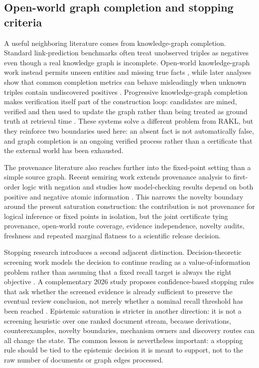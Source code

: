 \subsection{Open-world graph completion and stopping criteria}

A useful neighboring literature comes from knowledge-graph completion. Standard link-prediction benchmarks often treat unobserved triples as negatives even though a real knowledge graph is incomplete. Open-world knowledge-graph work instead permits unseen entities and missing true facts \cite{shi2017}, while later analyses show that common completion metrics can behave misleadingly when unknown triples contain undiscovered positives \cite{yang2022}. Progressive knowledge-graph completion makes verification itself part of the construction loop: candidates are mined, verified and then used to update the graph rather than being treated as ground truth at retrieval time \cite{li2024kg}. These systems solve a different problem from RAKL, but they reinforce two boundaries used here: an absent fact is not automatically false, and graph completion is an ongoing verified process rather than a certificate that the external world has been exhausted.

The provenance literature also reaches further into the fixed-point setting than a simple source graph. Recent semiring work extends provenance analysis to first-order logic with negation and studies how model-checking results depend on both positive and negative atomic information \cite{gradel2024}. This narrows the novelty boundary around the present saturation construction: the contribution is not provenance for logical inference or fixed points in isolation, but the joint certificate tying provenance, open-world route coverage, evidence independence, novelty audits, freshness and repeated marginal flatness to a scientific release decision.

Stopping research introduces a second adjacent distinction. Decision-theoretic screening work models the decision to continue reading as a value-of-information problem rather than assuming that a fixed recall target is always the right objective \cite{fletcher2026}. A complementary 2026 study proposes confidence-based stopping rules that ask whether the screened evidence is already sufficient to preserve the eventual review conclusion, not merely whether a nominal recall threshold has been reached \cite{fletcher2026b}. Epistemic saturation is stricter in another direction: it is not a screening heuristic over one ranked document stream, because derivations, counterexamples, novelty boundaries, mechanism owners and discovery routes can all change the state. The common lesson is nevertheless important: a stopping rule should be tied to the epistemic decision it is meant to support, not to the raw number of documents or graph edges processed.

